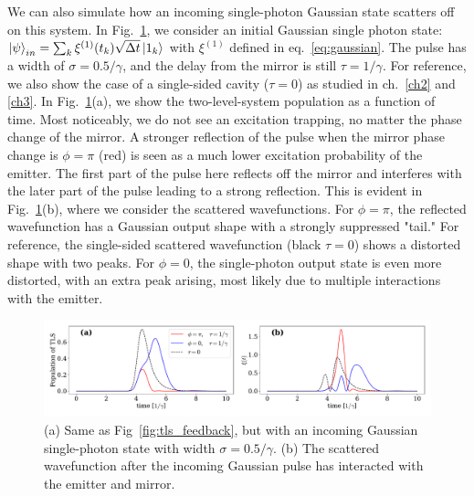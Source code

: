 We can also simulate how an incoming single-photon Gaussian state scatters off on this system. In Fig.~\ref{fig:onephoton_pulse}, we consider an initial Gaussian single photon state: $\ket{\psi}_{in} = \sum_k \xi^{(1)}(t_k) \sqrt{\Delta t} \ket{1_k}$ with $\xi^{(1)}$ defined in eq.~\eqref{eq:gaussian}. The pulse has a width of $\sigma = 0.5 / \gamma$, and the delay from the mirror is still $\tau = 1/\gamma$. For reference, we also show the case of a single-sided cavity ($\tau = 0$) as studied in ch.~\ref{ch2} and \ref{ch3}. In Fig.~\ref{fig:onephoton_pulse}(a), we show the two-level-system population as a function of time. Most noticeably, we do not see an excitation trapping, no matter the phase change of the mirror. A stronger reflection of the pulse when the mirror phase change is $\phi = \pi$ (red) is seen as a much lower excitation probability of the emitter. The first part of the pulse here reflects off the mirror and interferes with the later part of the pulse leading to a strong reflection. This is evident in Fig.~\ref{fig:onephoton_pulse}(b), where we consider the scattered wavefunctions. For $\phi = \pi$, the reflected wavefunction has a Gaussian output shape with a strongly suppressed "tail." For reference, the single-sided scattered wavefunction (black $\tau=0$) shows a distorted shape with two peaks. For $\phi = 0$, the single-photon output state is even more distorted, with an extra peak arising, most likely due to multiple interactions with the emitter.  


\begin{figure}[H]
    \centering
    \includegraphics[width=\linewidth]{figures/pulse_wf.pdf}
    \caption{(a) Same as Fig~\ref{fig:tls_feedback}, but with an incoming Gaussian single-photon state with width $\sigma = 0.5 /\gamma$. (b) The scattered wavefunction after the incoming Gaussian pulse has interacted with the emitter and mirror. }
    \label{fig:onephoton_pulse}
\end{figure}

